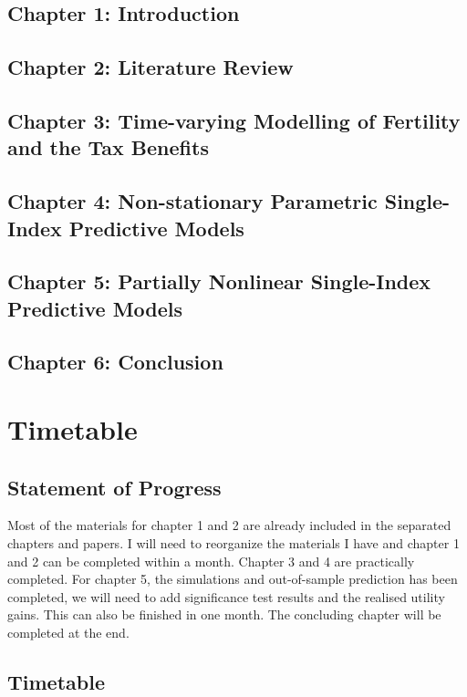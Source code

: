 \documentclass[a4paper,12pt,times,numbered,print,index]{report}
\numberwithin{equation}{section}
\begin{document}
\subsection*{Chapter 1: Introduction}

\subsection*{Chapter 2: Literature Review}

\subsection*{Chapter 3: Time-varying Modelling of Fertility and the Tax Benefits}

\subsection*{Chapter 4: Non-stationary Parametric Single-Index Predictive Models}

\subsection*{Chapter 5: Partially Nonlinear Single-Index Predictive Models}

\subsection*{Chapter 6: Conclusion}

\pagebreak

\section{Timetable}
\subsection{Statement of Progress}
Most of the materials for chapter 1 and 2 are already included in the separated chapters and papers. I will need to reorganize the materials I have and chapter 1 and 2 can be completed within a month. Chapter 3 and 4 are practically completed. For chapter 5, the simulations and out-of-sample prediction has been completed, we will need to add significance test results and the realised utility gains. This can also be finished in one month. The concluding chapter will be completed at the end.  

\subsection{Timetable}
\end{document}
